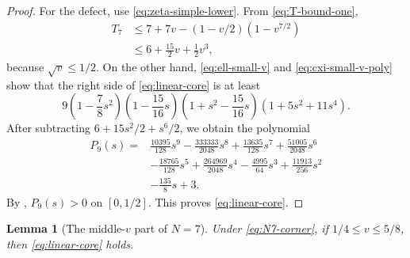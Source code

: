 \documentclass[11pt]{article}
\newtheorem{lemma}[theorem]{Lemma}
\begin{document}
\begin{proof}
For the defect, use \eqref{eq:zeta-simple-lower}.  From
\eqref{eq:T-bound-one},
\[
\begin{aligned}
 T_7
 &\le7+7v-(1-v/2)(1-v^{7/2})\\
 &\le6+\frac{15}{2}v+\frac12v^3,
\end{aligned}
\]
because \(\sqrt v\le1/2\).  On the other hand,
\eqref{eq:ell-small-v} and \eqref{eq:cxi-small-v-poly} show that the right
side of \eqref{eq:linear-core} is at least
\[
 9\left(1-\frac78s^2\right)
   \left(1-\frac{15}{16}s\right)
   \left(1+s^2-\frac{15}{16}s\right)
   (1+5s^2+11s^4).
\]
After subtracting \(6+15s^2/2+s^6/2\), we obtain the polynomial
\begin{equation}\label{eq:P9-small}
\begin{aligned}
 P_9(s)={}&\frac{10395}{128}s^9-\frac{333333}{2048}s^8
 +\frac{13635}{128}s^7+\frac{51005}{2048}s^6\\
 &-\frac{18765}{128}s^5+\frac{264969}{2048}s^4
 -\frac{4995}{64}s^3+\frac{11913}{256}s^2\\
 &-\frac{135}{8}s+3.
\end{aligned}
\end{equation}
By , \(P_9(s)>0\) on \([0,1/2]\).  This proves
\eqref{eq:linear-core}.
\end{proof}

\begin{lemma}[The middle-\(v\) part of \(N=7\)]\label{lem:N7-middle-v}
Under \eqref{eq:N7-corner}, if \(1/4\le v\le5/8\), then
\eqref{eq:linear-core} holds.
\end{lemma}
\end{document}
